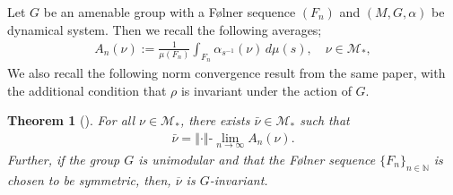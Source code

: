 \documentclass[11pt]{amsart}
\newtheorem{thm}{Theorem}[section]
\theoremstyle{definition}
\theoremstyle{myremark}
\numberwithin{equation}{section}
\newcommand{\CM}{\mathcal{M}}
\newcommand{\norm}[1]{\left\Vert#1\right\Vert}
\begin{document}
		\noindent Let $G$ be an amenable group with a F\o lner sequence $(F_n)$ and  $ (M, G, \alpha) $ be dynamical system. Then we recall the following averages; 
		\begin{align*}
			A_{n}(\nu) := \frac{1}{\mu(F_n)} \int_{F_n} \alpha_{ s^{-1}}(\nu) \, d\mu(s), \quad \nu \in \CM_*,
		\end{align*}
		 \noindent We also recall the following norm convergence result from the same paper, with the additional condition that $\rho$ is invariant under the action of $G$.
		
		\begin{thm}[{\cite[Theorem 4.6]{Bik-Dip-neveu}}] \label{mean erg thm for state}
			For all $\nu \in \CM_*$, there exists $\bar{\nu} \in \CM_*$ such that 
			\begin{align*}
				\bar{\nu} = \norm{\cdot}\text{-} \lim_{n \to \infty} A_{n}(\nu).
			\end{align*}
            Further, if the group $G$ is unimodular and that the F{\o}lner sequence $\{F_{n}\}_{n \in \mathbb{N}}$ is chosen to be symmetric, then, $\overline{\nu}$ is $G$-invariant.
		\end{thm}
\end{document}
